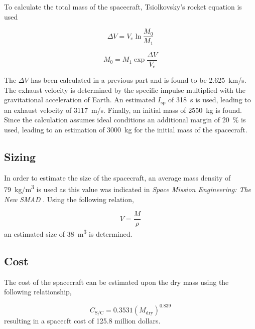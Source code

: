 To calculate the total mass of the spacecraft, Tsiolkovsky's rocket
equation is used

\begin{equation}
  \Delta V = V_e \ln \frac{M_0}{M_1}
\end{equation}

\begin{equation}
  M_0 = M_1 \exp \frac{\Delta V}{V_e}
\end{equation}

The $\Delta V$ has been calculated in a previous part and is found to
be \SI{2.625}{km/s}. The exhaust velocity is determined by the
specific impulse multiplied with the gravitational acceleration of
Earth. An estimated $I_{\mathrm{sp}}$ of \SI{318}{s} is used, leading to an
exhaust velocity of \SI{3117}{m/s}. Finally, an initial mass of
\SI{2550}{kg} is found. Since the calculation assumes ideal conditions
an additional margin of \SI{20}{\%} is used, leading to an estimation
of \SI{3000}{kg} for the initial mass of the spacecraft.

\subsection{Sizing}

In order to estimate the size of the spacecraft, an average mass
density of \SI{79}{kg/m^3} is used as this value was indicated in
\textit{Space Mission Engineering: The New SMAD}
\cite{Wertz2011SpaceMissionEng}. Using the following relation,

\begin{equation}
  V = \frac{M}{\rho}
\end{equation}
an estimated size of \SI{38}{m^3} is determined.

\subsection{Cost}

The cost of the spacecraft can be estimated upon the dry mass using
the following relationship\cite{ae1201reader},

\begin{equation}
  C_{\mathrm{S/C}} = 0.3531 (M_{\mathrm{dry}})^{0.839}
\end{equation}
resulting in a spacecft cost of 125.8 million dollars.


